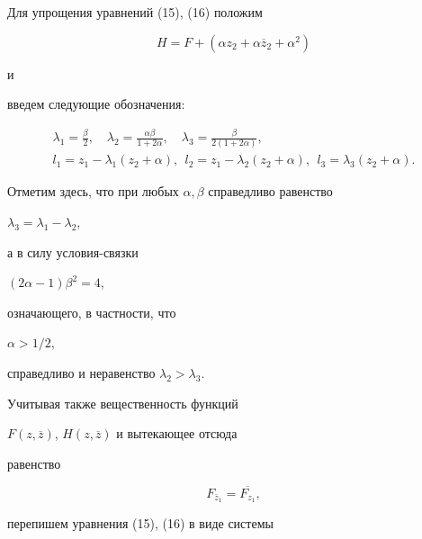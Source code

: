 Для упрощения уравнений (15), (16) положим 


$$


H = F + (\alpha z_2 + \alpha \overline z_2 + \alpha^2 )


$$


и 


введем следующие обозначения:


\begin{gather*}


\lambda_1 = \frac {\beta}2, \quad


\lambda_2 = \frac {\alpha \beta}{1 + 2\alpha}, \quad


\lambda_3 = \frac {\beta}{ 2 (1 + 2\alpha)}, \\


l_1 = z_1 - \lambda_1 ( z_2+ \alpha), \ \


l_2 = z_1 - \lambda_2 ( z_2+ \alpha), 


\ \


l_3 = \lambda_3 ( z_2+ \alpha).


\end{gather*}





Отметим здесь, что при любых $ \alpha, \beta $ справедливо равенство


$\lambda_3 = \lambda_1 - \lambda_2$,


а в силу условия-связки 


$ ( 2 \alpha - 1) \beta^2 = 4$, 


означающего, в частности, что


$ \alpha > 1/2 $, 


справедливо и неравенство $ \lambda_2 > \lambda_3 $. 





Учитывая также вещественность функций 


$ F (z, \overline z ) $, $ H (z, \overline z ) $ и вытекающее отсюда 


равенство


$$


 F_{\overline z_1} =


 \overline {F_{z_1} },


$$


перепишем уравнения (15), (16) в виде системы



